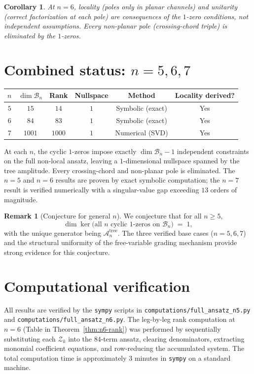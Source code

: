 \documentclass[11pt]{article}
\theoremstyle{plain}
\newtheorem{corollary}[theorem]{Corollary}
\theoremstyle{definition}
\newtheorem{remark}[theorem]{Remark}
\newcommand{\cA}{\mathcal{A}}
\newcommand{\cB}{\mathcal{B}}
\newcommand{\cZ}{\mathcal{Z}}
\begin{document}
\begin{corollary}
At $n=6$, locality (poles only in planar channels) and unitarity (correct
factorization at each pole) are consequences of the $1$-zero conditions, not
independent assumptions. Every non-planar pole (crossing-chord triple) is
eliminated by the $1$-zeros.
\end{corollary}

\section{Combined status: $n = 5, 6, 7$}

\begin{center}
\begin{tabular}{cccccc}
\toprule
$n$ & $\dim \cB_n$ & Rank & Nullspace & Method & Locality derived? \\
\midrule
$5$ & $15$   & $14$  & $1$ & Symbolic (exact) & Yes \\
$6$ & $84$   & $83$  & $1$ & Symbolic (exact) & Yes \\
$7$ & $1001$ & $1000$& $1$ & Numerical (SVD)  & Yes \\
\bottomrule
\end{tabular}
\end{center}

At each $n$, the cyclic $1$-zeros impose exactly $\dim \cB_n - 1$ independent
constraints on the full non-local ansatz, leaving a $1$-dimensional nullspace
spanned by the tree amplitude. Every crossing-chord and non-planar pole is
eliminated. The $n = 5$ and $n = 6$ results are proven by exact symbolic
computation; the $n = 7$ result is verified numerically with a singular-value
gap exceeding $13$ orders of magnitude.

\begin{remark}[Conjecture for general $n$]
We conjecture that for all $n \geq 5$,
\[
\dim \ker\bigl(\text{all $n$ cyclic $1$-zeros on } \cB_n\bigr) \;=\; 1,
\]
with the unique generator being $\cA_n^{\mathrm{tree}}$. The three verified base
cases ($n = 5, 6, 7$) and the structural uniformity of the free-variable grading
mechanism provide strong evidence for this conjecture.
\end{remark}

\section*{Computational verification}

All results are verified by the \texttt{sympy} scripts in
\texttt{computations/full\_ansatz\_n5.py} and
\texttt{computations/full\_ansatz\_n6.py}. The leg-by-leg rank computation at $n=6$
(Table in Theorem~\ref{thm:n6-rank}) was performed by sequentially substituting each
$\cZ_k$ into the $84$-term ansatz, clearing denominators, extracting monomial
coefficient equations, and row-reducing the accumulated system. The total computation
time is approximately $3$ minutes in \texttt{sympy} on a standard machine.
\end{document}
